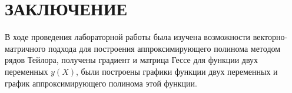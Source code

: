 \section*{ЗАКЛЮЧЕНИЕ}

В ходе проведения лабораторной работы была изучена возможности
векторно-матричного подхода для построения аппроксимирующего полинома
методом рядов Тейлора, получены градиент и матрица Гессе
для функции двух переменных $y(X)$,
были построены графики функции двух переменных и 
график аппроксимирующего полинома этой функции. 

\newpage
